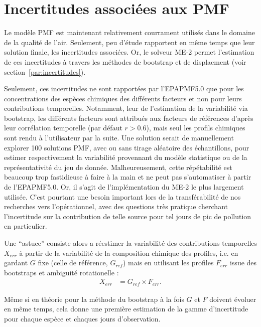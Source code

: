 \section{Incertitudes associées aux PMF}%
\label{sub:incertitudes_associées}

Le modèle PMF est maintenant relativement courrament utilisés dans le domaine de la
qualité de l'air. Seulement, peu d'étude rapportent en même temps que leur solution
finale, les incertitudes associées. Or, le solveur ME-2 permet l'estimation de ces
incertitudes à travers les méthodes de bootstrap et de displacment (voir
section~\ref{par:incertitudes}).

Seulement, ces incertitudes ne sont rapportées par l'EPAPMF5.0 que pour les concentrations
des espèces chimiques des différents facteurs et non pour leurs contributions temporelles.
Notamment, leur de l'estimation de la variabilité via bootstrap, les différents facteurs
sont attribués aux facteurs de références d'après leur corrélation temporelle (par défaut
$r > 0.6$), mais seul les profils chimiques sont rendu à l'utilisateur par la suite.
Une solution serait de manuellement explorer 100 solutions PMF, avec ou sans tirage
aléatoire des échantillons, pour estimer respectivement la variabilité provennant du modèle
statistique ou de la représentativité du jeu de donnée. Malheureusement, cette
répétabilité est beaucoup trop fastidieuse à faire à la main et ne peut pas s'automatiser à
partir de l'EPAPMF5.0. Or, il s'agit de l'implémentation du ME-2 le plus largement
utilisée. C'est pourtant une besoin important lors de la transférabilité de nos recherches
vers l'opérationnel, avec des questions très pratique cherchant l'incertitude
sur la contribution de telle source pour tel jours de pic de pollution en particulier.

Une ``astuce'' consiste alors a réestimer la variabilité des contributions temporelles
$X_{err}$ à partir de la variabilité de la composition chimique des profiles, i.e. en gardant
$G$ fixe (celle de référence, $G_{ref}$) mais en utilisant les profiles $F_{err}$ issue
des bootstraps et ambiguité rotationelle :
\begin{align}
    \label{eq:hack_unc}
    X_{err} &= G_{ref} \times F_{err}.
\end{align}

Même si en théorie pour la méthode du bootstrap à la fois $G$ et $F$ doivent
évoluer en même temps, cela donne une première estimation de la gamme d'incertitude pour
chaque espèce et chaques jours d'observation.

